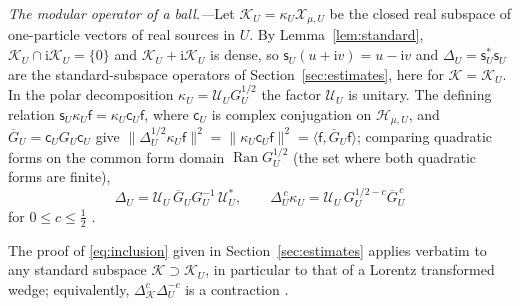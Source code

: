 \documentclass[aps,prl,reprint,longbibliography,raggedbottom]{revtex4-2}
\newcommand{\ii}{\mathrm i}
\newcommand{\norm}[1]{\lVert #1\rVert}
\newcommand{\ip}[2]{\langle #1,#2\rangle}
\DeclareMathOperator{\Ran}{Ran}
\newcommand{\Hh}{\mathcal H}
\newcommand{\sx}{\mathsf f}
\begin{document}
\emph{The modular operator of a ball.---}Let
$\mathcal K_U=\kappa_U\mathcal X_{\mu,U}$ be the closed real subspace of
one-particle vectors of real sources in $U$. By
Lemma~\ref{lem:standard}, $\mathcal K_U\cap\ii\mathcal K_U=\{0\}$ and
$\mathcal K_U+\ii\mathcal K_U$ is dense, so $\mathsf s_U(u+\ii v)=u-\ii v$
and $\Delta_U=\mathsf s_U^*\mathsf s_U$ are the standard-subspace
operators of Section~\ref{sec:estimates}, here for
$\mathcal K=\mathcal K_U$.
In the polar decomposition $\kappa_U=\mathcal U_UG_U^{1/2}$ the factor
$\mathcal U_U$ is unitary. The defining relation
$\mathsf s_U\kappa_U\sx=\kappa_U\mathsf c_U\sx$, where $\mathsf c_U$ is
complex conjugation on $\Hh_{\mu,U}$, and
$\overline G_U=\mathsf c_UG_U\mathsf c_U$ give
$\norm{\Delta_U^{1/2}\kappa_U\sx}^2=\norm{\kappa_U\mathsf c_U\sx}^2
=\ip\sx{\overline G_U\sx}$; comparing quadratic forms on the common
form domain $\Ran G_U^{1/2}$ (the set where both quadratic forms are
finite),
\begin{equation}
\Delta_U=\mathcal U_U\,\overline G_UG_U^{-1}\,\mathcal U_U^*,\qquad
\Delta_U^{\,c}\kappa_U=\mathcal U_U\,G_U^{1/2-c}\overline G_U^{\,c}
\label{eq:modular-source}
\end{equation}
for $0\le c\le\frac12$ \cite{RvD77,LS16}.

The proof of \eqref{eq:inclusion} given in
Section~\ref{sec:estimates} applies verbatim to any standard subspace
$\mathcal K\supset\mathcal K_U$, in particular to that of a Lorentz
transformed wedge; equivalently, $\Delta_{\mathcal K}^c\Delta_U^{-c}$
is a contraction \cite[Section~2]{BDL07}.
\end{document}
